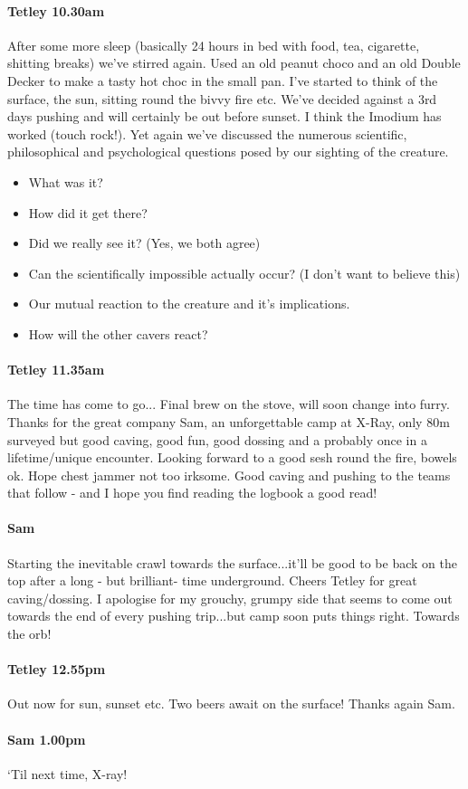 \paragraph{Tetley 10.30am}
After some more sleep (basically 24 hours in bed with food, tea, cigarette, shitting breaks) we’ve stirred again. Used an old peanut choco and an old Double Decker to make a tasty hot choc in the small pan. I’ve started to think of the surface, the sun, sitting round the bivvy fire etc. We’ve decided against a 3rd days pushing and will certainly be out before sunset. I think the Imodium has worked (touch rock!).
Yet again we’ve discussed the numerous scientific, philosophical and psychological questions posed by our sighting of the creature. 
\begin{itemize}
\item What was it?
\item How did it get there?
\item Did we really see it? (Yes, we both agree)
\item Can the scientifically impossible actually occur? (I don’t want to believe this)
\item Our mutual reaction to the creature and it’s implications.
\item How will the other cavers react?
\end{itemize}


\paragraph{Tetley 11.35am}
The time has come to go...
Final brew on the stove, will soon change into furry. Thanks for the great company Sam, an unforgettable camp at X-Ray, only 80m surveyed but good caving, good fun, good dossing and a probably once in a lifetime/unique encounter.
Looking forward to a good sesh round the fire, bowels ok. Hope chest jammer not too irksome.
Good caving and pushing to the teams that follow - and I hope you find reading the logbook a good read!


\paragraph{Sam}
Starting the inevitable crawl towards the surface...it’ll be good to be back on the top after a long - but brilliant- time underground. Cheers Tetley for great caving/dossing. I apologise for my grouchy, grumpy side that seems to come out towards the end of every pushing trip...but camp soon puts things right. Towards the orb!


\paragraph{Tetley 12.55pm}
Out now for sun, sunset etc. Two beers await on the surface! Thanks again Sam.


\paragraph{Sam 1.00pm}
‘Til next time, X-ray!


\label{Bibliography}

